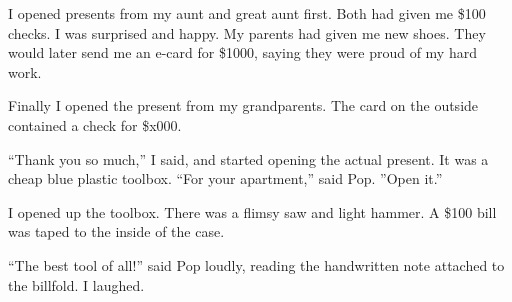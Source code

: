 I opened presents from my aunt and great aunt first.  Both had given me \$100
checks.  I was surprised and happy.  My parents had given me new shoes.  They
would later send me an e-card for \$1000, saying they were proud of my hard
work.  

Finally I opened the present from my grandparents.  The card on the outside
contained a check for \$x000.  

``Thank you so much,'' I said, and started opening the actual present.  It was a
cheap blue plastic toolbox.  ``For your apartment,'' said Pop.  ''Open it.''

I opened up the toolbox.  There was a flimsy saw and light hammer.  A \$100 bill
was taped to the inside of the case.

``The best tool of all!'' said Pop loudly, reading the handwritten note attached
to the billfold.  I laughed.
